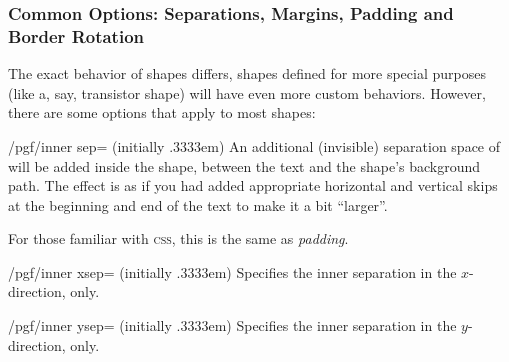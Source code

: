 \subsubsection{Common Options: Separations, Margins, Padding and
               Border Rotation}
\label{section-shape-seps}
\label{section-shape-common-options}

The  exact behavior of shapes
differs, shapes defined for more special purposes (like a, say, transistor
shape) will have even more custom behaviors. However, there are some options
that apply to most shapes:

\begin{key}{/pgf/inner sep= (initially .3333em)}
    An additional (invisible) separation space of  will be
    added inside the shape, between the text and the shape's background path.
    The effect is as if you had added appropriate horizontal and vertical skips
    at the beginning and end of the text to make it a bit ``larger''.

    For those familiar with \textsc{css}, this is the same as \emph{padding}.
\begin{codeexample}[]
\end{codeexample}
\end{key}

\begin{key}{/pgf/inner xsep= (initially .3333em)}
    Specifies the inner separation in the $x$-direction, only.
\end{key}

\begin{key}{/pgf/inner ysep= (initially .3333em)}
    Specifies the inner separation in the $y$-direction, only.
\end{key}

